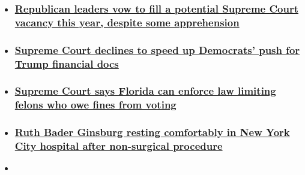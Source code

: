 \begin{itemize}
\item
  \hypertarget{republican-leaders-vow-to-fill-a-potential-supreme-court-vacancy-this-year-despite-some-apprehension}{%
  \subsubsection{\texorpdfstring{\href{/2020/07/20/politics/supreme-court-senate-republicans-election-year/index.html}{Republican
  leaders vow to fill a potential Supreme Court vacancy this year,
  despite some
  apprehension}}{Republican leaders vow to fill a potential Supreme Court vacancy this year, despite some apprehension}}\label{republican-leaders-vow-to-fill-a-potential-supreme-court-vacancy-this-year-despite-some-apprehension}}
\item
  \hypertarget{supreme-court-declines-to-speed-up-democrats-push-for-trump-financial-docs}{%
  \subsubsection{\texorpdfstring{\href{/2020/07/20/politics/democrats-trump-mazars-supreme-court/index.html}{Supreme
  Court declines to speed up Democrats' push for Trump financial
  docs}}{Supreme Court declines to speed up Democrats' push for Trump financial docs}}\label{supreme-court-declines-to-speed-up-democrats-push-for-trump-financial-docs}}
\item
  \hypertarget{supreme-court-says-florida-can-enforce-law-limiting-felons-who-owe-fines-from-voting}{%
  \subsubsection{\texorpdfstring{\href{/2020/07/16/politics/supreme-court-florida-felons/index.html}{Supreme
  Court says Florida can enforce law limiting felons who owe fines from
  voting}}{Supreme Court says Florida can enforce law limiting felons who owe fines from voting}}\label{supreme-court-says-florida-can-enforce-law-limiting-felons-who-owe-fines-from-voting}}
\item
  \hypertarget{ruth-bader-ginsburg-resting-comfortably-in-new-york-city-hospital-after-non-surgical-procedure}{%
  \subsubsection{\texorpdfstring{\href{/2020/07/29/politics/ruth-bader-ginsburg-latest-procedure/index.html}{Ruth
  Bader Ginsburg resting comfortably in New York City hospital after
  non-surgical
  procedure}}{Ruth Bader Ginsburg resting comfortably in New York City hospital after non-surgical procedure}}\label{ruth-bader-ginsburg-resting-comfortably-in-new-york-city-hospital-after-non-surgical-procedure}}
\item
  \hypertarget{supreme-court-decides-against-nevada-church-fighting-to-overturn-attendance-limit}{%
}
\end{itemize}
